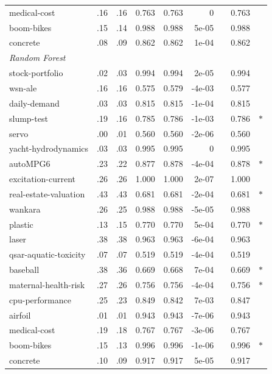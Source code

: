 \begin{tabular}{l@{\hspace{3pt}}r@{\hspace{3pt}}r@{\hspace{3pt}}r@{\hspace{3pt}}r@{\hspace{3pt}}r@{\hspace{3pt}}c@{\hspace{3pt}}r@{\hspace{3pt}}c}
medical-cost & .16 & .16 & 0.763 & 0.763 & 0 &  & 0.763 &  \\
boom-bikes & .15 & .14 & 0.988 & 0.988 &  5e-05 &  & 0.988 &  \\
concrete & .08 & .09 & 0.862 & 0.862 &  1e-04 &  & 0.862 &  \\
\midrule
\multicolumn{9}{l}{\emph{Random Forest}} \\
stock-portfolio & .02 & .03 & 0.994 & 0.994 &  2e-05 &  & 0.994 &  \\
wsn-ale & .16 & .16 & 0.575 & 0.579 & -4e-03 &  & 0.577 &  \\
daily-demand & .03 & .03 & 0.815 & 0.815 & -1e-04 &  & 0.815 &  \\
slump-test & .19 & .16 & 0.785 & 0.786 & -1e-03 &  & 0.786 & $\ast$ \\
servo & .00 & .01 & 0.560 & 0.560 & -2e-06 &  & 0.560 &  \\
yacht-hydrodynamics & .03 & .03 & 0.995 & 0.995 & 0 &  & 0.995 &  \\
autoMPG6 & .23 & .22 & 0.877 & 0.878 & -4e-04 &  & 0.878 & $\ast$ \\
excitation-current & .26 & .26 & 1.000 & 1.000 &  2e-07 &  & 1.000 &  \\
real-estate-valuation & .43 & .43 & 0.681 & 0.681 & -2e-04 &  & 0.681 & $\ast$ \\
wankara & .26 & .25 & 0.988 & 0.988 & -5e-05 &  & 0.988 &  \\
plastic & .13 & .15 & 0.770 & 0.770 &  5e-04 &  & 0.770 & $\ast$ \\
laser & .38 & .38 & 0.963 & 0.963 & -6e-04 &  & 0.963 &  \\
qsar-aquatic-toxicity & .07 & .07 & 0.519 & 0.519 & -4e-04 &  & 0.519 &  \\
baseball & .38 & .36 & 0.669 & 0.668 &  7e-04 &  & 0.669 & $\ast$ \\
maternal-health-risk & .27 & .26 & 0.756 & 0.756 & -4e-04 &  & 0.756 & $\ast$ \\
cpu-performance & .25 & .23 & 0.849 & 0.842 &  7e-03 &  & 0.847 &  \\
airfoil & .01 & .01 & 0.943 & 0.943 & -7e-06 &  & 0.943 &  \\
medical-cost & .19 & .18 & 0.767 & 0.767 & -3e-06 &  & 0.767 &  \\
boom-bikes & .15 & .13 & 0.996 & 0.996 & -1e-06 &  & 0.996 & $\ast$ \\
concrete & .10 & .09 & 0.917 & 0.917 &  5e-05 &  & 0.917 &  \\
\bottomrule
\end{tabular}
